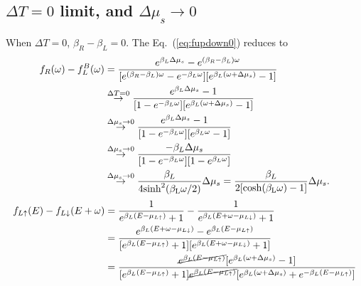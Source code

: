 \documentclass[aps,prb,onecolumn,amssymb,amsmath,superscriptaddress]{revtex4-1}
\begin{document}
\subsection{$\Delta T=0$ limit, and $\Delta\mu_s\to0$}
When $\Delta T = 0$, $\beta_{R} - \beta_{L} = 0$. The Eq.~(\ref{eq:fupdown0}) reduces to
\begin{equation}
\begin{split}
f_{R}(\omega)-f_{L}^{B}(\omega) & =\frac{e^{\beta_{L}\Delta\mu_{s}} - e^{(\beta_{R}-\beta_{L})\omega}}{[e^{(\beta_{R}-\beta_{L})\omega}-e^{-\beta_{L}\omega}][e^{\beta_{L}(\omega+\Delta\mu_{s})}-1]} \\
&\stackrel{\Delta T= 0}{\rightarrow} \frac{e^{\beta_{L}\Delta\mu_{s}} - 1}{ [1 - e^{-\beta_{L}\omega}][e^{\beta_{L}(\omega+\Delta\mu_{s})}-1]}\\
&\stackrel{\Delta \mu_s\to 0}{\rightarrow} \frac{e^{\beta_{L}\Delta\mu_{s}} - 1}{ [1 - e^{-\beta_{L}\omega}][e^{\beta_{L}\omega}-1]} \\
&\stackrel{\Delta \mu_s\to 0}{\rightarrow} \frac{-\beta_{L}\Delta\mu_{s}}{ [1 - e^{-\beta_{L}\omega}][1-e^{\beta_{L}\omega}]} \\
& \stackrel{\Delta \mu_s\to 0}{\rightarrow} \frac{\beta_{L}} {4\rm{sinh}^2(\beta_{L}\omega/2)} \Delta\mu_{s}= \frac{\beta_{L}} {2[\rm{cosh}(\beta_{L}\omega)-1]}\Delta\mu_{s}.
\end{split}
\end{equation}
\begin{equation}
\begin{split}
f_{L\uparrow}(E)-f_{L\downarrow}(E+\omega) &= \frac{1}{e^{\beta_{L}(E-\mu_{L\uparrow})}+1} - \frac{1}{e^{\beta_{L}(E+\omega-\mu_{L\downarrow})}+1} \\
&= \frac{e^{\beta_{L}(E+\omega-\mu_{L\downarrow})}- e^{\beta_{L}(E-\mu_{L\uparrow})}} {[e^{\beta_{L}(E-\mu_{L\uparrow})}+1] [e^{\beta_{L}(E+\omega-\mu_{L\downarrow})}+1]} \\
& = \frac{\cancel{e^{\beta_L(E-\mu_{L\uparrow})}} [e^{\beta_{L}(\omega+\Delta\mu_s)}- 1]} {[e^{\beta_{L}(E-\mu_{L\uparrow})}+1] \cancel{e^{\beta_L(E-\mu_{L\uparrow})}} [e^{\beta_{L}(\omega+\Delta\mu_s)}+e^{-\beta_L(E-\mu_{L\uparrow})}]}
\end{split}
\end{equation}
\end{document}
